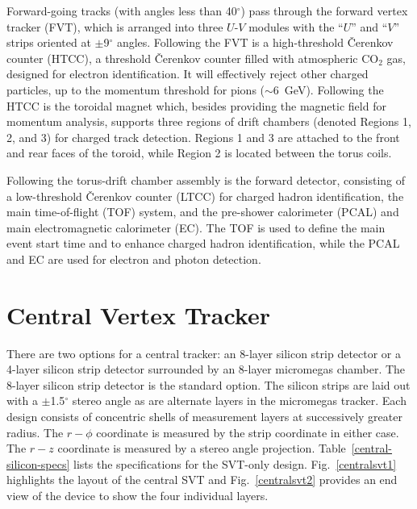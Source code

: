 Forward-going tracks (with angles less than 40$^{\circ}$) pass through
the forward vertex tracker (FVT), which is arranged into three $U$-$V$ 
modules with the ``$U$'' and ``$V$'' strips oriented at $\pm$9$^{\circ}$ 
angles.  Following the FVT is a high-threshold {\v C}erenkov counter (HTCC), 
a threshold {\v C}erenkov counter filled with atmospheric CO$_2$ gas, 
designed for electron identification.  It will effectively reject other 
charged particles, up to the momentum threshold for pions ($\sim$6~GeV).  
Following the HTCC is the toroidal magnet which, besides providing the 
magnetic field for momentum analysis, supports three regions of drift 
chambers (denoted Regions 1, 2, and 3) for charged track detection.  
Regions 1 and 3 are attached to the front and rear faces of the toroid, 
while Region 2 is located between the torus coils.

Following the torus-drift chamber assembly is the forward detector,
consisting of a low-threshold {\v C}erenkov counter (LTCC) for charged 
hadron identification, the main time-of-flight (TOF) system, and the 
pre-shower calorimeter (PCAL) and main electromagnetic calorimeter (EC).  
The TOF is used to define the main event start time and to enhance charged 
hadron identification, while the PCAL and EC are used for electron and
photon detection.

\section{Central Vertex Tracker}

There are two options for a central tracker: an 8-layer silicon strip 
detector or a 4-layer silicon strip detector surrounded by an 8-layer 
micromegas chamber.  The 8-layer silicon strip detector is the standard 
option. The silicon strips are laid out with a $\pm$1.5$^{\circ}$ stereo 
angle as are alternate layers in the micromegas tracker.  Each design 
consists of concentric shells of measurement layers at successively greater 
radius. The $r-\phi$ coordinate is measured by the strip coordinate in 
either case. The $r-z$ coordinate is measured by a stereo angle projection. 
Table~\ref{central-silicon-specs} lists the specifications for the SVT-only
design.  Fig.~\ref{centralsvt1} highlights the layout of the central SVT and 
Fig.~\ref{centralsvt2} provides an end view of the device to show the
four individual layers.

